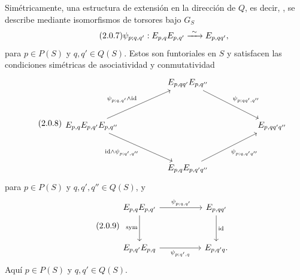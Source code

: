 Simétricamente, una estructura de extensión en la dirección de $Q$,
es decir, , se describe
mediante isomorfismos de torsores bajo $G_S$
\begin{equation}\tag{2.0.7}
 \psi_{p;q,q'}:E_{p,q}E_{p,q'}
 \xrightarrow{\ \sim\ }\sisi{E_{pp',q}}{E_{p,qq'}},
\end{equation}
para $p\in P(S)$ y $q,q'\in Q(S)$. Estos son funtoriales en $S$ y
satisfacen las condiciones simétricas de asociatividad y
conmutatividad
\begin{equation}\tag{2.0.8}
\begin{tikzcd}[column sep=5.1em,row sep=3.4em]
 & E_{p,qq'}E_{p,q''}
   \arrow[rd,"{\psi_{p;qq',q''}}"] & \\
 E_{p,q}E_{p,q'}E_{p,q''}
   \arrow[ru,"{\psi_{p;q,q'}\wedge\mathrm{id}}"]
   \arrow[rd,"{\mathrm{id}\wedge\psi_{p;q',q''}}"']
 && E_{p,qq'q''} \\
 & E_{p,q}E_{p,q'q''}
   \arrow[ru,"{\sisi{\psi_{p;q;q'q''}}{\psi_{p;q,q'q''}}}"'] &
\end{tikzcd}
\end{equation}
para $p\in P(S)$ y $q,q',q''\in Q(S)$, y
\begin{equation}\tag{2.0.9}
\begin{tikzcd}[column sep=5em,row sep=3.1em]
 E_{p,q}E_{p,q'} \arrow[r,"{\psi_{p;q,q'}}"]
   \arrow[d,"\mathrm{sym}"']
 & E_{p,qq'} \arrow[d,"\mathrm{id}"] \\
 E_{p,q'}E_{p,q} \arrow[r,"{\psi_{p;q',q}}"']
 & E_{p,q'q}.
\end{tikzcd}
\end{equation}
Aquí $p\in P(S)$ y $q,q'\in Q(S)$.


